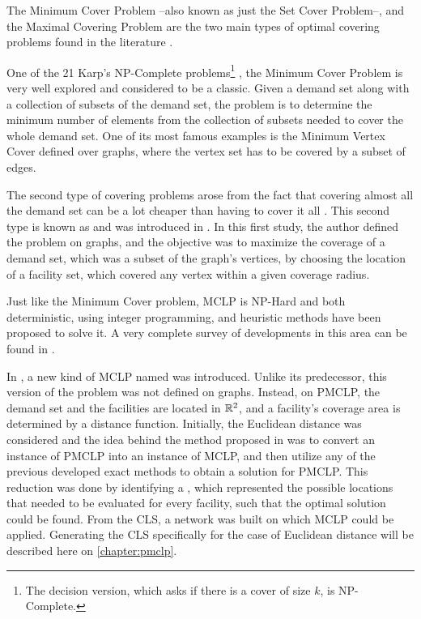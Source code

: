 The Minimum Cover Problem --also known as just the Set Cover Problem--, and the Maximal Covering Problem are the two main types of optimal covering problems found in the literature \cite{karatas}. 

One of the 21 Karp's NP-Complete problems\footnote{The decision version, which asks if there is a cover of size $k$, is NP-Complete.} \cite{karp}, the Minimum Cover Problem is very well explored and considered to be a classic. 
Given a demand set along with a collection of subsets of the demand set, the problem is to determine the minimum number of elements from the collection of subsets needed to cover the whole demand set. One of its most famous examples is the Minimum Vertex Cover defined over graphs, where the vertex set has to be covered by a subset of edges.

The second type of covering problems arose from the fact that covering almost all the demand set can be a lot cheaper than having to cover it all \cite{garcia}. This second type is known as  and was introduced in .
In this first study, the author defined the problem on graphs, and the objective was to maximize the coverage of a demand set, which was a subset of the graph's vertices, by choosing the location of a facility set, which covered any vertex within a given coverage radius.

Just like the Minimum Cover problem, MCLP is NP-Hard \cite{hatta:2013} and both deterministic, using integer programming, and heuristic methods have been proposed to solve it. A very complete survey of developments in this area can be found in .

In , a new kind of MCLP named  was introduced. Unlike its predecessor, this version of the problem was not defined on graphs. Instead, on PMCLP, the demand set and the facilities are located in $\mathbb{R}^2$, and a facility's coverage area is determined by a distance function.
Initially, the Euclidean distance was considered and the idea behind the method proposed in  was to convert an instance of PMCLP into an instance of MCLP, and then utilize any of the previous developed exact methods to obtain a solution for PMCLP. This reduction was done by identifying a , which represented the possible locations that needed to be evaluated for every facility, such that the optimal solution could be found. From the CLS, a network was built on which MCLP could be applied. Generating the CLS specifically for the case of Euclidean distance will be described here on \autoref{chapter:pmclp}.

